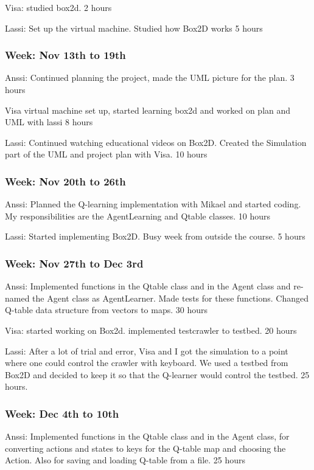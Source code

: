 \documentclass{article}
\begin{document}
Visa: 
studied box2d.
2 hours

Lassi:
Set up the virtual machine. Studied how Box2D works
5 hours

\subsubsection{Week: Nov 13th to 19th}
Anssi:
Continued planning the project, made the UML picture for the plan.
3 hours

Visa
virtual machine set up, started learning box2d and worked on plan
and UML with lassi 
8 hours

Lassi:
Continued watching educational videos on Box2D. Created the Simulation 
part of the UML and project plan with Visa. 
10 hours

\subsubsection{Week: Nov 20th to 26th}
Anssi:
Planned the Q-learning implementation with Mikael and started coding.
My responsibilities are the AgentLearning and Qtable classes.
10 hours

Lassi:
Started implementing Box2D. Busy week from outside the course.
5 hours

\subsubsection{Week: Nov 27th to Dec 3rd}
Anssi:
Implemented functions in the Qtable class and in the Agent class and
re-named the Agent class as AgentLearner. Made tests for these functions.
Changed Q-table data structure from vectors to maps.
30 hours

Visa:
started working on Box2d. implemented testcrawler to testbed.
20 hours

Lassi:
After a lot of trial and error, Visa and I got the simulation to a point 
where one could control the crawler with keyboard. We used a testbed from 
Box2D and decided to keep it so that the Q-learner would control the testbed.
25 hours.

\subsubsection{Week: Dec 4th to 10th}
Anssi:
Implemented functions in the Qtable class and in the Agent class, for
converting actions and states to keys for the Q-table map and choosing
the Action. Also for saving and loading Q-table from a file.
25 hours
\end{document}
